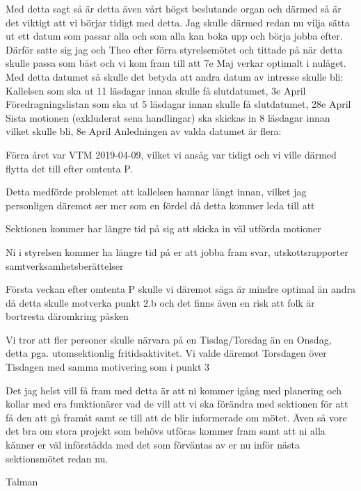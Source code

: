 \documentclass[10pt]{article}
\begin{document}
    Med detta sagt så är detta även vårt högst beslutande organ och därmed så är det viktigt att vi börjar tidigt med detta. Jag skulle därmed redan nu vilja sätta ut ett datum som passar alla och som alla kan boka upp och börja jobba efter.
    \newline \newline Därför satte sig jag och Theo efter förra styrelsemötet och tittade på när detta skulle passa som bäst och vi kom fram till att 7e Maj verkar optimalt i nuläget. Med detta datumet så skulle det betyda att andra datum av intresse skulle bli:
    \newline Kallelsen som ska ut 11 läsdagar innan skulle få slutdatumet, 3e April
    \newline Föredragningslistan som ska ut 5 läsdagar innan skulle få slutdatumet, 28e April
    \newline Sista motionen (exkluderat sena handlingar) ska skickas in 8 läsdagar innan vilket skulle bli, 8e April
    \newline \newline Anledningen av valda datumet är flera:
    \begin{numplist}
        \item Förra året var VTM 2019-04-09, vilket vi ansåg var tidigt och vi ville därmed flytta det till efter omtenta P.
        \item Detta medförde problemet att kallelsen hamnar långt innan, vilket jag personligen däremot ser mer som en fördel då detta kommer leda till att
        \begin{alphlist}
            \item Sektionen kommer har längre tid på sig att skicka in väl utförda motioner
            \item Ni i styrelsen kommer ha längre tid på er att jobba fram svar, utskottsrapporter samtverksamhetsberättelser
        \end{alphlist}
        \item Första veckan efter omtenta P skulle vi däremot säga är mindre optimal än andra då detta skulle motverka punkt 2.b och det finns även en risk att folk är bortresta däromkring påsken
        \item Vi tror att fler personer skulle närvara på en Tisdag/Torsdag än en Onsdag, detta pga. utomsektionlig fritidsaktivitet. Vi valde däremot Torsdagen över Tisdagen med samma motivering som i punkt 3
    \end{numplist}
    Det jag helst vill få fram med detta är att ni kommer igång med planering och kollar med era funktionärer vad de vill att vi ska förändra med sektionen för att få den att gå framåt samt se till att de blir informerade om mötet. Även så vore det bra om stora projekt som behövs utföras kommer fram samt att ni alla känner er väl införstådda med det som förväntas av er nu inför nästa sektionsmötet redan nu.
    
    \begin{signatures}{1}
    \textit{\isekt}
    \signature{Henrik Ramström}{Talman}
    \end{signatures}

    
\end{document}

